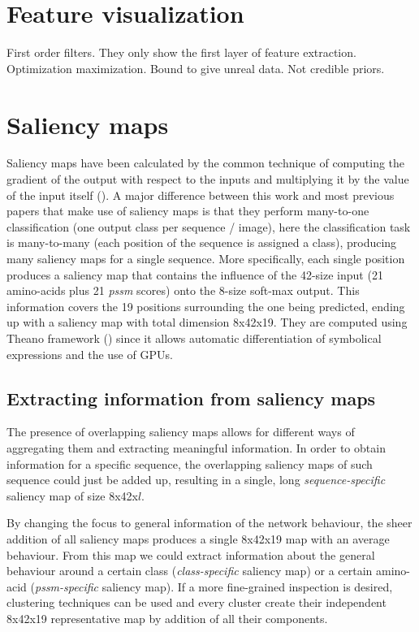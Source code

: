 		
		
\section{Feature visualization}
First order filters. They only show the first layer of feature extraction.
Optimization maximization. Bound to give unreal data. Not credible priors.


\section{Saliency maps} \label{sect:saliency}


Saliency maps have been calculated by the common technique of computing the gradient of the output with respect to the inputs and multiplying it by the value of the input itself (\cite{Shrikumar2016}). A major difference between this work and most previous papers that make use of saliency maps is that they perform many-to-one classification (one output class per sequence / image), here the classification task is many-to-many (each position of the sequence is assigned a class), producing many saliency maps for a single sequence. More specifically, each single position produces a saliency map that contains the influence of the 42-size input (21 amino-acids plus 21 \textit{pssm} scores) onto the 8-size soft-max output. This information covers the 19 positions surrounding the one being predicted, ending up with a saliency map with total dimension 8x42x19. They are computed using Theano framework (\cite{TheTheanoDevelopmentTeam2016}) since it allows automatic differentiation of symbolical expressions and the use of GPUs.

	\subsection{Extracting information from saliency maps}
	The presence of overlapping saliency maps allows for different ways of aggregating them and extracting meaningful information. In order to obtain information for a specific sequence, the overlapping saliency maps of such sequence could just be added up, resulting in a single, long \textit{sequence-specific} saliency map of size 8x42x$l$.
	
	By changing the focus to general information of the network behaviour, the sheer addition of all saliency maps produces a single 8x42x19 map with an average behaviour. From this map we could extract information about the general behaviour around a certain class (\textit{class-specific} saliency map) or a certain amino-acid (\textit{pssm-specific} saliency map). If a more fine-grained inspection is desired, clustering techniques can be used and every cluster create their independent 8x42x19 representative map by addition of all their components.
	

